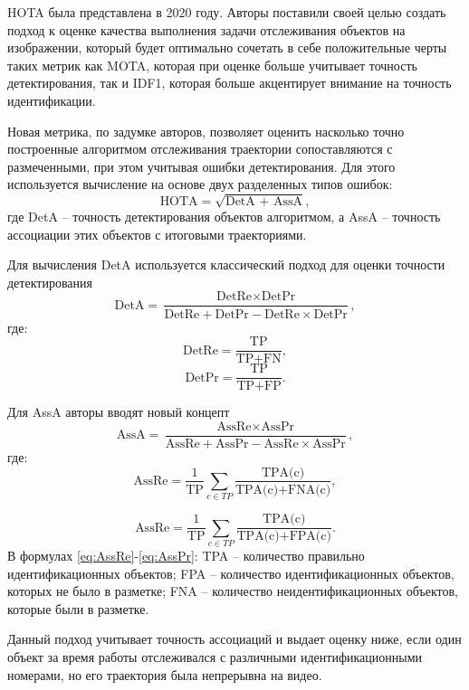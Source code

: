 HOTA \cite{luiten2021hota} была представлена в 2020 году. Авторы поставили своей целью создать подход к оценке качества выполнения задачи отслеживания объектов на изображении, который будет оптимально сочетать в себе положительные черты таких метрик как MOTA, которая при оценке больше учитывает точность детектирования, так и IDF1, которая больше акцентирует внимание на точность идентификации.

Новая метрика, по задумке авторов, позволяет оценить насколько точно построенные алгоритмом отслеживания траектории сопоставляются с размеченными, при этом учитывая ошибки детектирования. Для этого используется вычисление на основе двух разделенных типов ошибок:
\begin{equation}
    \label{eq:hota}
    \text{HOTA} = \sqrt{\text{DetA + AssA}},
\end{equation}
где DetA -- точность детектирования объектов алгоритмом, а AssA -- точность ассоциации этих объектов с итоговыми траекториями. 

Для вычисления DetA используется классический подход для оценки точности детектирования
\begin{equation}
    \label{eq:detA}
    \text{DetA} = \frac{\text{DetRe} \times \text{DetPr}}{\text{DetRe} + \text{DetPr} - \text{DetRe} \times \text{DetPr}},
\end{equation}
где:
\begin{equation}
    \label{eq:detRe}
    \text{DetRe} = \frac{\text{TP}}{\text{TP} + \text{FN}},
\end{equation}
\begin{equation}
    \label{eq:detPr}
    \text{DetPr} = \frac{\text{TP}}{\text{TP} + \text{FP}}.
\end{equation}

Для AssA авторы вводят новый концепт
\begin{equation}
    \label{eq:AssA}
    \text{AssA} = \frac{\text{AssRe} \times \text{AssPr}}{\text{AssRe} + \text{AssPr} - \text{AssRe} \times \text{AssPr}},
\end{equation}
где: 
\begin{equation}
    \label{eq:AssRe}
    \text{AssRe} = \frac{1}{\text{TP}} \sum_{c \in {TP}} \frac{\text{TPA(c)}}{\text{TPA(c)} + \text{FNA(c)}},
\end{equation}

\begin{equation}
    \label{eq:AssPr}
    \text{AssRe} = \frac{1}{\text{TP}} \sum_{c \in {TP}} \frac{\text{TPA(c)}}{\text{TPA(c)} + \text{FPA(c)}}.
\end{equation}
В формулах \ref{eq:AssRe}-\ref{eq:AssPr}: TPA -- количество правильно идентификационных объектов; FPA -- количество идентификационных объектов, которых не было в разметке; FNA -- количество неидентификационных объектов, которые были в разметке.

Данный подход учитывает точность ассоциаций и выдает оценку ниже, если один объект за время работы отслеживался с различными идентификационными номерами, но его траектория была непрерывна на видео.